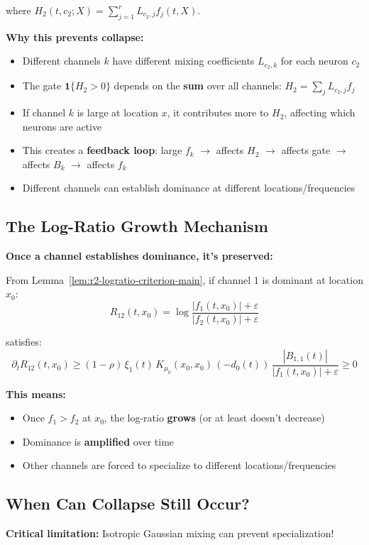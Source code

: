 where $H_2(t, c_2; X) = \sum_{j=1}^r L_{c_2,j} f_j(t, X)$.

\textbf{Why this prevents collapse:}
\begin{itemize}
\item Different channels $k$ have different mixing coefficients $L_{c_2,k}$ for each neuron $c_2$
\item The gate $\mathbf{1}\{H_2 > 0\}$ depends on the \textbf{sum} over all channels: $H_2 = \sum_j L_{c_2,j} f_j$
\item If channel $k$ is large at location $x$, it contributes more to $H_2$, affecting which neurons are active
\item This creates a \textbf{feedback loop}: large $f_k$ $\to$ affects $H_2$ $\to$ affects gate $\to$ affects $B_k$ $\to$ affects $f_k$
\item Different channels can establish dominance at different locations/frequencies
\end{itemize}

\subsection{The Log-Ratio Growth Mechanism}

\textbf{Once a channel establishes dominance, it's preserved:}

From Lemma~\ref{lem:r2-logratio-criterion-main}, if channel 1 is dominant at location $x_0$:
\[
R_{12}(t, x_0) = \log\frac{|f_1(t, x_0)| + \varepsilon}{|f_2(t, x_0)| + \varepsilon}
\]

satisfies:
\[
\partial_t R_{12}(t, x_0) \ge (1-\rho)\,\xi_1(t)\,K_{\mu_0}(x_0, x_0)\,(-d_0(t))\,\frac{|B_{1,1}(t)|}{|f_1(t, x_0)| + \varepsilon} \ge 0
\]

\textbf{This means:}
\begin{itemize}
\item Once $f_1 > f_2$ at $x_0$, the log-ratio \textbf{grows} (or at least doesn't decrease)
\item Dominance is \textbf{amplified} over time
\item Other channels are forced to specialize to different locations/frequencies
\end{itemize}

\subsection{When Can Collapse Still Occur?}

\textbf{Critical limitation:} Isotropic Gaussian mixing can prevent specialization!


